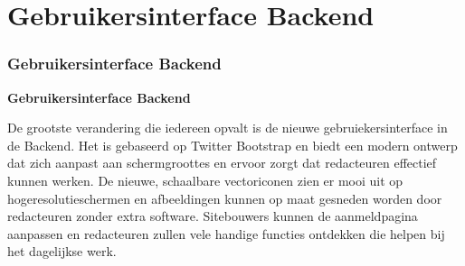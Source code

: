 %

\section{Gebruikersinterface Backend}
\begin{frame}[fragile]
	\frametitle{Gebruikersinterface Backend}

	\begin{center}\huge{\color{typo3darkgrey}\textbf{Gebruikersinterface Backend}}\end{center}

	De grootste verandering die iedereen opvalt is de nieuwe gebruiekersinterface in de
	Backend. Het is gebaseerd op Twitter Bootstrap en biedt een modern ontwerp dat zich
	aanpast aan schermgroottes en ervoor zorgt dat redacteuren effectief kunnen werken.\newline
	De nieuwe, schaalbare vectoriconen zien er mooi uit op hogeresolutieschermen en
	afbeeldingen kunnen op maat gesneden worden door redacteuren zonder extra software.\newline
	Sitebouwers kunnen de aanmeldpagina aanpassen en redacteuren zullen vele handige
	functies ontdekken die helpen bij het dagelijkse werk.

\end{frame}

